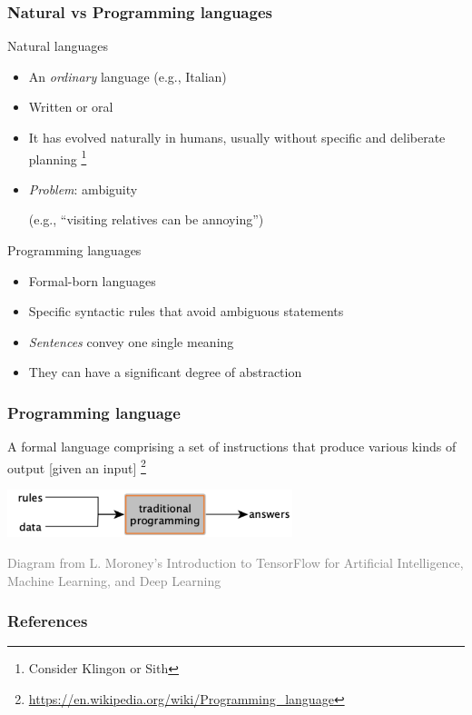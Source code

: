 \documentclass[xcolor=x11names,handout]{beamer}
\newcommand{\light}[1]{\textcolor{gray}{#1}}
\begin{document}
\begin{frame}
\frametitle{Natural vs Programming languages}

\alert{Natural languages}

\begin{itemize}
\item An \textit{ordinary} language (e.g., Italian)
\item Written or oral
\item It has evolved naturally in humans, usually without specific and 
deliberate planning%
\footnote{Consider Klingon or Sith}
\item \textit{Problem}: ambiguity

(e.g., ``visiting relatives can be annoying'')
\end{itemize}
\pause

\alert{Programming languages}
\begin{itemize}
\item Formal-born languages
\item Specific syntactic rules that avoid ambiguous statements
\item \textit{Sentences} convey one single meaning
\item They can have a significant degree of abstraction
\end{itemize}
\end{frame}

\begin{frame}
\frametitle{Programming language}

A formal language comprising a set of instructions that produce various kinds 
of 
output [given an input]%
\footnote{\url{https://en.wikipedia.org/wiki/Programming_language}}
\bigskip
\pause

\begin{center}
\includegraphics[width=83mm]{img/02_programming.png}
\end{center}
\bigskip 

\footnotesize \light{Diagram from L. Moroney's Introduction to TensorFlow for 
Artificial Intelligence, Machine Learning, and Deep Learning}
\end{frame}



\begin{frame}[allowframebreaks]
\frametitle{References}


\end{frame}
\end{document}
